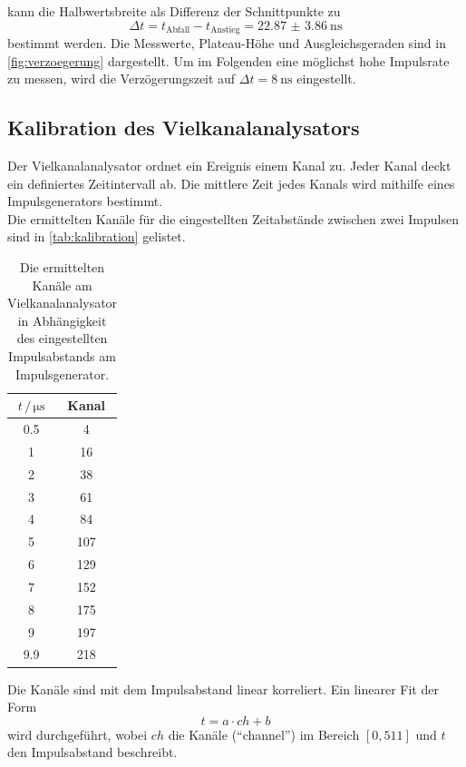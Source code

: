 kann die Halbwertsbreite als Differenz der Schnittpunkte zu
\begin{equation}
    \Delta t = t_\text{Abfall} - t_\text{Anstieg} = \qty{22.87(386)}{\nano\second}
\end{equation}
bestimmt werden.
Die Messwerte, Plateau-Höhe und Ausgleichsgeraden sind in \autoref{fig:verzoegerung} dargestellt.
Um im Folgenden eine möglichst hohe Impulsrate zu messen, wird die Verzögerungszeit auf $\Delta t = \qty{8}{\nano\second}$ eingestellt.%
\FloatBarrier

\subsection{Kalibration des Vielkanalanalysators}
Der Vielkanalanalysator ordnet ein Ereignis einem Kanal zu.
Jeder Kanal deckt ein definiertes Zeitintervall ab.
Die mittlere Zeit jedes Kanals wird mithilfe eines Impulsgenerators bestimmt.
\\
Die ermittelten Kanäle für die eingestellten Zeitabstände zwischen zwei Impulsen sind in \autoref{tab:kalibration} gelistet.
\begin{table}
    \centering
    \caption{Die ermittelten Kanäle am Vielkanalanalysator in Abhängigkeit des eingestellten Impulsabstands am Impulsgenerator.}
    \label{tab:kalibration}
    \begin{tabular}{cc}
        \toprule
        $t \,/\, \unit{\micro\second}$ & Kanal \\
        \midrule
        0.5 & 4 \\
        1 & 16 \\
        2 & 38 \\
        3 & 61 \\
        4 & 84 \\
        5 & 107 \\
        6 & 129 \\
        7 & 152 \\
        8 & 175 \\
        9 & 197 \\
        9.9 & 218 \\
        \bottomrule
    \end{tabular}
\end{table}
Die Kanäle sind mit dem Impulsabstand linear korreliert.
Ein linearer Fit der Form
\begin{equation}
    t = a \cdot ch + b
    \label{eqn:fit_kanal}
\end{equation}
wird durchgeführt, wobei $ch$ die Kanäle ("`channel"') im Bereich $[0, 511]$ und $t$ den Impulsabstand beschreibt.
